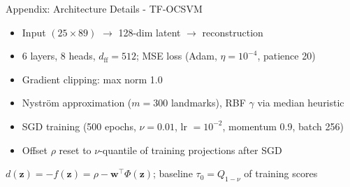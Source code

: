 \documentclass{beamer}
\begin{document}
\begin{frame}{Appendix: Architecture Details - TF-OCSVM}
    \begin{tcolorbox}[keybox, title=Transformer Bottleneck AE]
        \begin{itemize}
            \item Input $(25 \times 89)$ $\to$ 128-dim latent $\to$ reconstruction
            \item 6 layers, 8 heads, $d_{\text{ff}}{=}512$; MSE loss (Adam, $\eta{=}10^{-4}$, patience 20)
            \item Gradient clipping: max norm 1.0
        \end{itemize}
    \end{tcolorbox}
    \begin{tcolorbox}[keybox, title=Nystr{\"o}m OC-SVM]
        \begin{itemize}
            \item Nystr{\"o}m approximation ($m{=}300$ landmarks), RBF $\gamma$ via median heuristic
            \item SGD training (500 epochs, $\nu{=}0.01$, lr $= 10^{-2}$, momentum 0.9, batch 256)
            \item Offset $\rho$ reset to $\nu$-quantile of training projections after SGD
        \end{itemize}
    \end{tcolorbox}
    \begin{tcolorbox}[keybox, title=Dissimilarity Score]
        $d(\mathbf{z}) = -f(\mathbf{z}) = \rho - \mathbf{w}^\top \Phi(\mathbf{z})$; \quad baseline $\tau_0 = Q_{1-\nu}$ of training scores
    \end{tcolorbox}
\end{frame}
\end{document}

